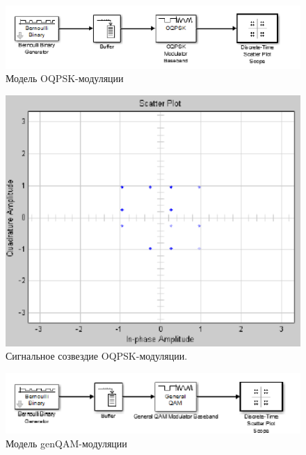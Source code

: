 \begin{figure}[H]
\includegraphics[width=150mm, scale = 0.9]{lab9/9_25}
   \caption{Модель OQPSK-модуляции}
\end{figure}



\begin{figure}[H]
\includegraphics[width=150mm, scale = 0.9]{lab9/9_26}
   \caption{Сигнальное созвездие OQPSK-модуляции.}
\end{figure}



\begin{figure}[H]
\includegraphics[width=150mm, scale = 0.9]{lab9/9_27}
   \caption{Модель genQAM-модуляции}
\end{figure}



